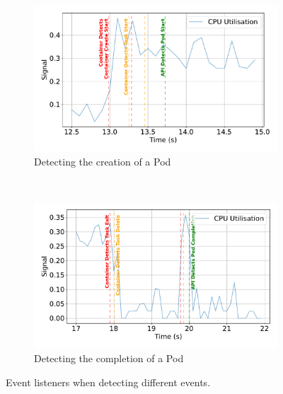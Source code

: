 \begin{figure}[ht!] %
    \centering %
    \begin{subfigure}[b]{\textwidth} %
        \centering
        \includegraphics[width=\textwidth]{images/event-comparison-start.pdf}
        \caption{Detecting the creation of a Pod} %
    \end{subfigure}\\
    \begin{subfigure}[b]{\textwidth}
        \centering
        \includegraphics[width=\textwidth]{images/event-comparison-end.pdf}
        \caption{Detecting the completion of a Pod} %
    \end{subfigure}
    \caption{Event listeners when detecting different events.}
    \label{fig:event-evaluation}
\end{figure}


